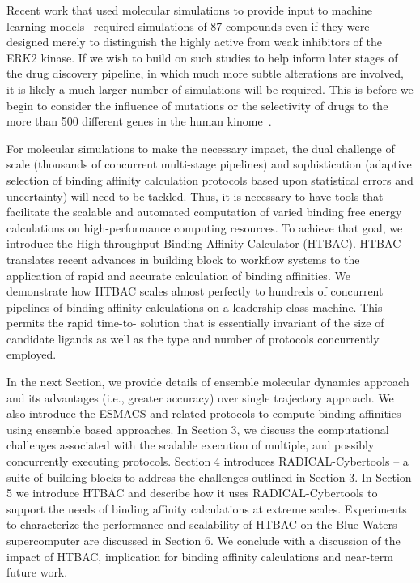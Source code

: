 Recent work that used molecular simulations to provide input to machine
learning models~\cite{Ash2017} required simulations of 87 compounds even if
they were designed merely to distinguish the highly active from weak
inhibitors of the ERK2 kinase. If we wish to build on such studies to help
inform later stages of the drug discovery pipeline, in which much more subtle
alterations are involved, it is likely a much larger number of simulations
will be required. This is before we begin to consider the influence of
mutations or the selectivity of drugs to the more than 500 different
genes in the human kinome~\cite{Li2016}.

For molecular simulations to make the necessary impact, the dual challenge of
scale (thousands of concurrent multi-stage pipelines) and sophistication
(adaptive selection of binding affinity calculation protocols based upon
statistical errors and uncertainty) will need to be tackled. 
Thus, it is necessary to have tools that facilitate
the scalable and automated computation of varied binding free energy
calculations on high-performance computing resources. To achieve that goal,
we introduce the High-throughput Binding Affinity Calculator (HTBAC). HTBAC
translates recent advances in building block to workflow systems to the
application of rapid and accurate calculation of  binding affinities. We
demonstrate how HTBAC scales almost perfectly to hundreds of concurrent
pipelines of binding affinity calculations on a leadership class machine. This
permits the rapid time-to- solution that is essentially invariant of the size
of candidate ligands as well as the type and number of protocols concurrently
employed.

In the next Section, we provide details of ensemble molecular dynamics
approach and its advantages (i.e., greater accuracy) over single trajectory
approach. We also introduce the ESMACS and related protocols to compute
binding affinities using ensemble based approaches. In Section 3, we discuss
the computational challenges associated with the scalable execution of
multiple, and possibly concurrently executing protocols. Section 4 introduces
RADICAL-Cybertools -- a suite of building blocks to address the challenges
outlined in Section 3. In Section 5 we introduce HTBAC and describe how it
uses RADICAL-Cybertools to support the needs of binding affinity calculations
at extreme scales. Experiments to characterize the performance and scalability
of HTBAC on the Blue Waters supercomputer are discussed in Section 6. We
conclude with a discussion of the impact of HTBAC, implication for binding
affinity calculations and near-term future work.

